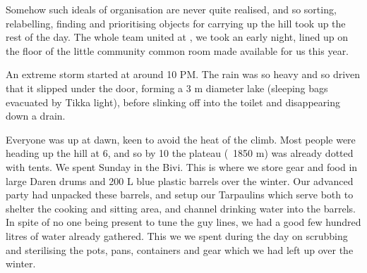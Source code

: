 Somehow such ideals of organisation are never quite realised, and so sorting, relabelling, finding and prioritising objects for carrying up the hill took up the rest of the day. The whole team united at , we took an early night, lined up on the floor of the little community common room made available for us this year. 

An extreme storm started at around 10 PM. The rain was so heavy and so driven that it slipped under the door, forming a 3 m diameter lake (sleeping bags evacuated by Tikka light), before slinking off into the toilet and disappearing down a drain.

Everyone was up at dawn, keen to avoid the heat of the climb. Most people were heading up the hill at 6, and so by 10 the plateau (~1850 m) was already dotted with tents. We spent Sunday in the Bivi. This is where we store gear and food in large Daren drums and 200 L blue plastic barrels over the winter. Our advanced party had unpacked these barrels, and setup our Tarpaulins which serve both to shelter the cooking and sitting area, and channel drinking water into the barrels. In spite of no one being present to tune the guy lines, we had a good few hundred litres of water already gathered. This we we spent during the day on scrubbing and sterilising the pots, pans, containers and gear which we had left up over the winter. 

